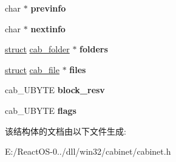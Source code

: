 \begin{DoxyCompactItemize}
\item 
\mbox{\label{structcabinet_af91b896d173b9b32e1b92f122c0115fc}} 
char $\ast$ {\bfseries previnfo}
\item 
\mbox{\label{structcabinet_a377a35038b8f0d450fec196c9208047e}} 
char $\ast$ {\bfseries nextinfo}
\item 
\mbox{\label{structcabinet_a5278e719ea9ac9c250e342fb7ec1a425}} 
\hyperlink{interfacestruct}{struct} \hyperlink{structcab__folder}{cab\+\_\+folder} $\ast$ {\bfseries folders}
\item 
\mbox{\label{structcabinet_a5db0321ae4cd0bd0d81c7f7bd5f5cffc}} 
\hyperlink{interfacestruct}{struct} \hyperlink{structcab__file}{cab\+\_\+file} $\ast$ {\bfseries files}
\item 
\mbox{\label{structcabinet_ac4aa16bfe5657d8a07713050576cff1e}} 
cab\+\_\+\+U\+B\+Y\+TE {\bfseries block\+\_\+resv}
\item 
\mbox{\label{structcabinet_ad52b9a9a6854956286de637b8d6ec520}} 
cab\+\_\+\+U\+B\+Y\+TE {\bfseries flags}
\end{DoxyCompactItemize}


该结构体的文档由以下文件生成\+:\begin{DoxyCompactItemize}
\item 
E\+:/\+React\+O\+S-\/0../dll/win32/cabinet/cabinet.\+h\end{DoxyCompactItemize}
